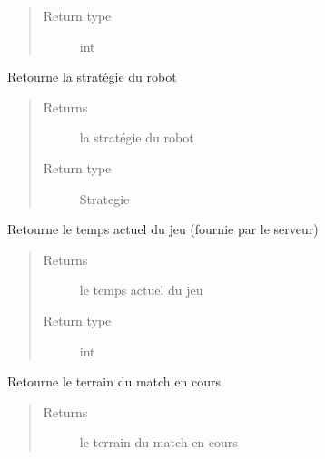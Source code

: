 \documentclass[letterpaper,10pt,english]{sphinxmanual}
\begin{document}
\begin{fulllineitems}
\begin{fulllineitems}
\begin{quote}
\begin{description}
\item[{Return type}] \leavevmode
int

\end{description}\end{quote}

\end{fulllineitems}


\begin{fulllineitems}
\label{index:Robot.Robot.getStrategie}
Retourne la stratégie du robot
\begin{quote}\begin{description}
\item[{Returns}] \leavevmode
la stratégie du robot

\item[{Return type}] \leavevmode
Strategie

\end{description}\end{quote}

\end{fulllineitems}


\begin{fulllineitems}
\label{index:Robot.Robot.getTemps}
Retourne le temps actuel du jeu (fournie par le serveur)
\begin{quote}\begin{description}
\item[{Returns}] \leavevmode
le temps actuel du jeu

\item[{Return type}] \leavevmode
int

\end{description}\end{quote}

\end{fulllineitems}


\begin{fulllineitems}
\label{index:Robot.Robot.getTerrain}
Retourne le terrain du match en cours
\begin{quote}\begin{description}
\item[{Returns}] \leavevmode
le terrain du match en cours


\end{description}
\end{quote}
\end{fulllineitems}
\end{fulllineitems}
\end{document}
